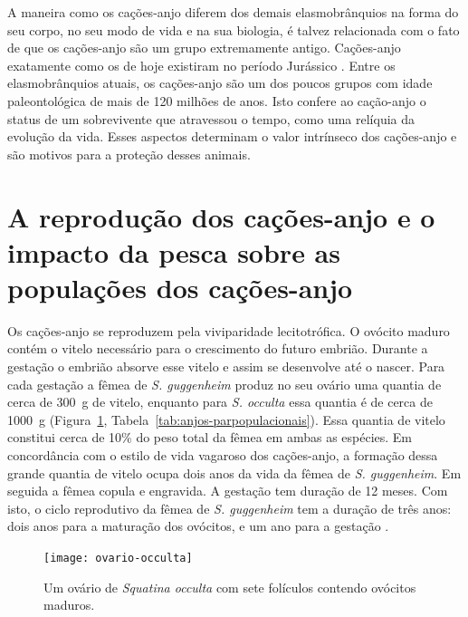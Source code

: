 \documentclass[a4paper,11pt,twoside,showtrims,onecolumn,openright,final]{memoir}
\begin{document}

A maneira como os cações-anjo diferem dos demais elasmobrânquios na forma do seu corpo, 
no seu modo de vida e na sua biologia, é talvez relacionada com o fato de que os cações-anjo 
são um grupo extremamente antigo. Cações-anjo exatamente como os de hoje existiram 
no período Jurássico \citep{cappetta1987}. %
Entre os elasmobrânquios atuais, os cações-anjo são um dos poucos grupos com idade paleontológica 
de mais de 120 milhões de anos. Isto confere ao cação-anjo o status de um sobrevivente que 
atravessou o tempo, como uma relíquia da evolução da vida. Esses aspectos determinam o valor 
intrínseco dos cações-anjo e são motivos para a proteção desses animais.  

\section*{A reprodução dos cações-anjo e o impacto da pesca sobre as populações dos cações-anjo}

Os cações-anjo se reproduzem pela viviparidade lecitotrófica. O ovócito maduro  contém o vitelo 
necessário para o crescimento do futuro embrião. Durante a gestação o embrião absorve esse vitelo 
e assim se desenvolve até o nascer. Para cada gestação a fêmea de \emph{S. guggenheim} produz no seu 
ovário uma quantia de cerca de 300~g de vitelo, enquanto para \emph{S. occulta} 
essa quantia é de cerca de 1000~g (Figura~\ref{fig:anjos-ovario-occulta}, Tabela~\ref{tab:anjos-parpopulacionais}). %
Essa quantia de vitelo constitui cerca de 10\% do peso total da fêmea em ambas as espécies. 
Em concordância com o estilo de vida vagaroso dos cações-anjo, a formação dessa grande quantia 
de vitelo ocupa dois anos da vida da fêmea de \emph{S. guggenheim}. Em seguida a fêmea copula e engravida. 
A gestação tem duração de 12 meses. Com isto, o ciclo reprodutivo da fêmea de \emph{S. guggenheim} tem 
a duração de três anos: dois anos para a maturação dos ovócitos, e um ano para a gestação \citep{silva1996}. %

%
%

\begin{figure}
\begin{center}
\texttt{[image: ovario-occulta]}
\end{center}
\caption[Ovário de \emph{Squatina occulta}]
	{Um ovário de \emph{Squatina occulta} com sete folículos contendo ovócitos maduros.}
\label{fig:anjos-ovario-occulta}
\end{figure}
\end{document}
